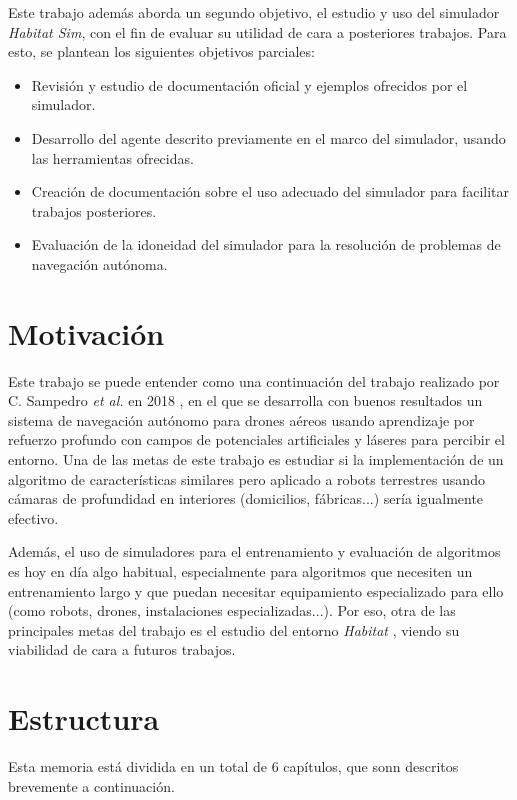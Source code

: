 Este trabajo además aborda un segundo objetivo, el estudio y uso del simulador \textit{Habitat Sim}, con el fin de evaluar su utilidad de cara a posteriores trabajos. Para esto, se plantean los siguientes objetivos parciales:

\begin{itemize}
	\item Revisión y estudio de documentación oficial y ejemplos ofrecidos por el simulador.
	\item Desarrollo del agente descrito previamente en el marco del simulador, usando las herramientas ofrecidas.
	\item Creación de documentación sobre el uso adecuado del simulador para facilitar trabajos posteriores.
	\item Evaluación de la idoneidad del simulador para la resolución de problemas de navegación autónoma.
\end{itemize}

\section{Motivación}

Este trabajo se puede entender como una continuación del trabajo realizado por C. Sampedro \textit{et al.} en 2018 \cite{Sampedro2018}, en el que se desarrolla con buenos resultados un sistema de navegación autónomo para drones aéreos usando aprendizaje por refuerzo profundo con campos de potenciales artificiales y láseres para percibir el entorno. Una de las metas de este trabajo es estudiar si la implementación de un algoritmo de características similares pero aplicado a robots terrestres usando cámaras de profundidad en interiores (domicilios, fábricas...) sería igualmente efectivo.

Además, el uso de simuladores para el entrenamiento y evaluación de algoritmos es hoy en día algo habitual, especialmente para algoritmos que necesiten un entrenamiento largo y que puedan necesitar equipamiento especializado para ello (como robots, drones, instalaciones especializadas...). Por eso, otra de las principales metas del trabajo es el estudio del entorno \textit{Habitat} \cite{habitat19iccv} \cite{szot2021habitat}, viendo su viabilidad de cara a futuros trabajos.

\section{Estructura}


Esta memoria está dividida en un total de 6 capítulos, que sonn descritos brevemente a continuación.

